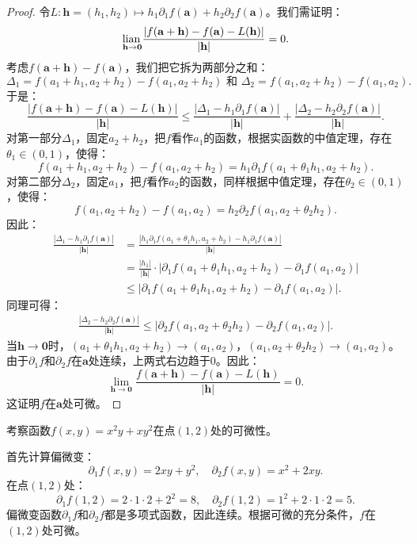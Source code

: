 \documentclass[12pt,UTF8,fontset=none]{ctexbook}
\begin{document}
\begin{appendix}
\begin{proof}    
令$L:\mathbf{h} = (h_1,h_2) \mapsto h_1\partial_1 f(\mathbf{a}) + h_2\partial_2 f(\mathbf{a})$。我们需证明：
$$ \underset{\mathbf{h}\to\mathbf{0}}{\operatorname{lian}\,} \frac{|f(\mathbf{a}+\mathbf{h}) - f(\mathbf{a}) - L(\mathbf{h})|}{|\mathbf{h}|} = 0. $$
考虑$f(\mathbf{a}+\mathbf{h}) - f(\mathbf{a})$，我们把它拆为两部分之和：
$$ \Delta_1 = f(a_1+h_1,a_2+h_2) - f(a_1,a_2+h_2) \,\, \mbox{和}\,\,\Delta_2 = f(a_1,a_2+h_2) - f(a_1,a_2). $$
于是：
$$ \frac{|f(\mathbf{a}+\mathbf{h}) - f(\mathbf{a}) - L(\mathbf{h})|}{|\mathbf{h}|} \leqslant \frac{|\Delta_1 - h_1\partial_1 f(\mathbf{a})|}{|\mathbf{h}|} + \frac{|\Delta_2 - h_2\partial_2 f(\mathbf{a})|}{|\mathbf{h}|}.  $$
对第一部分$\Delta_1$，固定$a_2+h_2$，把$f$看作$a_1$的函数，根据实函数的中值定理，存在$\theta_1\in(0,1)$，使得：
$$ f(a_1+h_1,a_2+h_2) - f(a_1,a_2+h_2) = h_1\partial_1 f(a_1+\theta_1 h_1,a_2+h_2). $$
对第二部分$\Delta_2$，固定$a_1$，把$f$看作$a_2$的函数，同样根据中值定理，存在$\theta_2\in(0,1)$，使得：
$$ f(a_1,a_2+h_2) - f(a_1,a_2) = h_2\partial_2 f(a_1,a_2+\theta_2 h_2). $$
因此：
\begin{align*}
\frac{|\Delta_1 - h_1\partial_1 f(\mathbf{a})|}{|\mathbf{h}|} &= \frac{|h_1\partial_1 f(a_1+\theta_1 h_1,a_2+h_2) - h_1\partial_1 f(\mathbf{a})|}{|\mathbf{h}|} \\
&= \frac{|h_1|}{|\mathbf{h}|}\cdot|\partial_1 f(a_1+\theta_1 h_1,a_2+h_2) - \partial_1 f(a_1,a_2)| \\
&\leqslant |\partial_1 f(a_1+\theta_1 h_1,a_2+h_2) - \partial_1 f(a_1,a_2)|.
\end{align*}
同理可得：
\begin{align*}
    \frac{|\Delta_2 - h_2\partial_2 f(\mathbf{a})|}{|\mathbf{h}|} \leqslant |\partial_2 f(a_1,a_2+\theta_2 h_2) - \partial_2 f(a_1,a_2)|.
\end{align*}
当$\mathbf{h}\to\mathbf{0}$时，$(a_1+\theta_1 h_1,a_2+h_2)\to(a_1,a_2)$，$(a_1,a_2+\theta_2 h_2)\to(a_1,a_2)$。由于$\partial_1 f$和$\partial_2 f$在$\mathbf{a}$处连续，上两式右边趋于$0$。因此：
$$ \lim_{\mathbf{h}\to\mathbf{0}} \frac{f(\mathbf{a}+\mathbf{h}) - f(\mathbf{a}) - L(\mathbf{h})}{|\mathbf{h}|} = 0. $$
这证明$f$在$\mathbf{a}$处可微。
\end{proof}

\begin{et}
考察函数$f(x,y) = x^2y + xy^2$在点$(1,2)$处的可微性。
\end{et}

\begin{so}
首先计算偏微变：
$$ \partial_1 f(x,y) = 2xy + y^2, \quad \partial_2 f(x,y) = x^2 + 2xy. $$
在点$(1,2)$处：
$$ \partial_1 f(1,2) = 2\cdot1\cdot2 + 2^2 = 8, \quad \partial_2 f(1,2) = 1^2 + 2\cdot1\cdot2 = 5. $$
偏微变函数$\partial_1 f$和$\partial_2 f$都是多项式函数，因此连续。根据可微的充分条件，$f$在$(1,2)$处可微。


\end{so}
\end{appendix}
\end{document}
